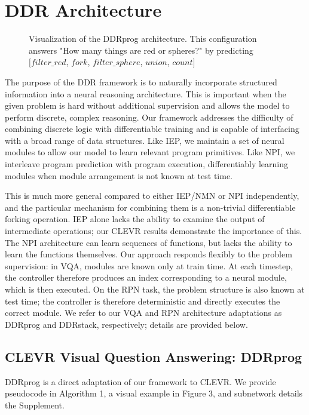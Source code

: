 \documentclass{article}
\begin{document}
\section{DDR Architecture}
\begin{figure*}
  \centering
  \vspace{-4mm}
  \caption{Visualization of the DDRprog architecture. This configuration answers "How many things are red or spheres?" by predicting $[filter\_red$, $fork$, $filter\_sphere$, $union$, $count]$}
  \vspace{-2mm}
\end{figure*}
The purpose of the DDR framework is to naturally incorporate structured information into a neural reasoning architecture. This is important when the given problem is hard without additional supervision and allows the model to perform discrete, complex reasoning. Our framework addresses the difficulty of combining discrete logic with differentiable training and is capable of interfacing with a broad range of data structures. Like IEP, we maintain a set of neural modules to allow our model to learn relevant program primitives. Like NPI, we interleave program prediction with program execution, differentiably learning modules when module arrangement is not known at test time.

This is much more general compared to either IEP/NMN or NPI independently, and the particular mechanism for combining them is a non-trivial differentiable forking operation. IEP alone lacks the ability to examine the output of intermediate operations; our CLEVR results demonstrate the importance of this. The NPI architecture can learn sequences of functions, but lacks the ability to learn the functions themselves. Our approach responds flexibly to the problem supervision: in VQA, modules are known only at train time. At each timestep, the controller therefore produces an index corresponding to a neural module, which is then executed. On the RPN task, the problem structure is also known at test time; the controller is therefore deterministic and directly executes the correct module. We refer to our VQA and RPN architecture adaptations as DDRprog and DDRstack, respectively; details are provided below.

\subsection{CLEVR Visual Question Answering: DDRprog}
DDRprog is a direct adaptation of our framework to CLEVR. We provide pseudocode in Algorithm 1, a visual example in Figure 3, and subnetwork details the Supplement.
\end{document}
